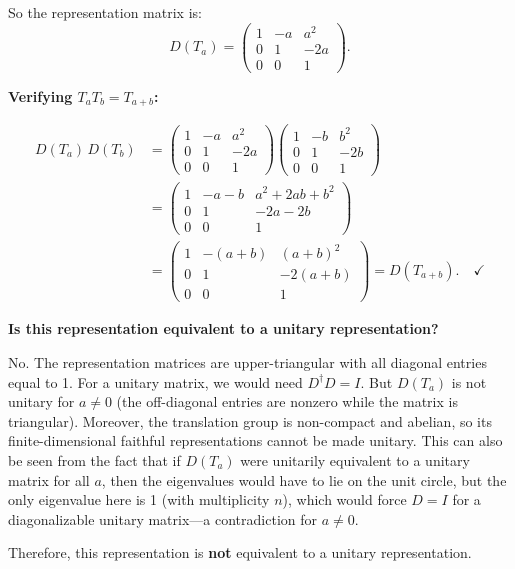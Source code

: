 \documentclass[12pt]{article}
\begin{document}
So the representation matrix is:
\[
D(T_a) = \begin{pmatrix} 1 & -a & a^2 \\ 0 & 1 & -2a \\ 0 & 0 & 1 \end{pmatrix}.
\]

\noindent\textbf{Verifying $T_a T_b = T_{a+b}$:}

\begin{align*}
D(T_a)\,D(T_b) &= \begin{pmatrix} 1 & -a & a^2 \\ 0 & 1 & -2a \\ 0 & 0 & 1 \end{pmatrix}
\begin{pmatrix} 1 & -b & b^2 \\ 0 & 1 & -2b \\ 0 & 0 & 1 \end{pmatrix} \\[6pt]
&= \begin{pmatrix} 1 & -a-b & a^2 + 2ab + b^2 \\ 0 & 1 & -2a - 2b \\ 0 & 0 & 1 \end{pmatrix} \\[6pt]
&= \begin{pmatrix} 1 & -(a+b) & (a+b)^2 \\ 0 & 1 & -2(a+b) \\ 0 & 0 & 1 \end{pmatrix} = D(T_{a+b}). \quad \checkmark
\end{align*}

\medskip
\noindent\textbf{Is this representation equivalent to a unitary representation?}

No. The representation matrices are upper-triangular with all diagonal entries equal to 1. For a unitary matrix, we would need $D^\dagger D = I$. But $D(T_a)$ is not unitary for $a \neq 0$ (the off-diagonal entries are nonzero while the matrix is triangular). Moreover, the translation group is non-compact and abelian, so its finite-dimensional faithful representations cannot be made unitary. This can also be seen from the fact that if $D(T_a)$ were unitarily equivalent to a unitary matrix for all $a$, then the eigenvalues would have to lie on the unit circle, but the only eigenvalue here is 1 (with multiplicity $n$), which would force $D = I$ for a diagonalizable unitary matrix---a contradiction for $a \neq 0$.

Therefore, this representation is \textbf{not} equivalent to a unitary representation.
\end{document}
